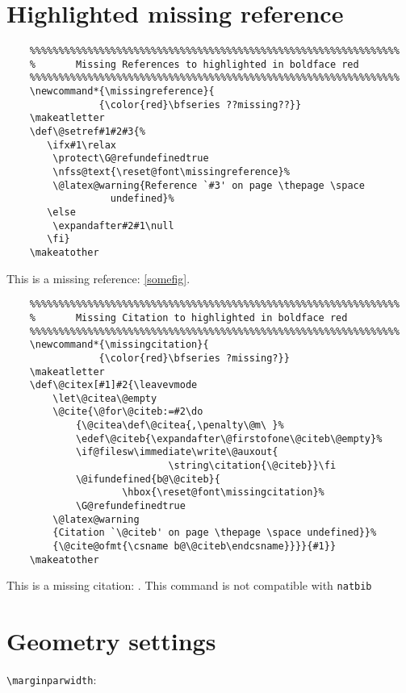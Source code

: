 \documentclass{article}
\begin{document}
\section{Highlighted missing reference}
\begin{minipage}[t]{0.78\textwidth}
    \begin{verbatim}
    %%%%%%%%%%%%%%%%%%%%%%%%%%%%%%%%%%%%%%%%%%%%%%%%%%%%%%%%%%%%%%%%
    %       Missing References to highlighted in boldface red
    %%%%%%%%%%%%%%%%%%%%%%%%%%%%%%%%%%%%%%%%%%%%%%%%%%%%%%%%%%%%%%%%
    \newcommand*{\missingreference}{
                {\color{red}\bfseries ??missing??}}
    \makeatletter
    \def\@setref#1#2#3{%
       \ifx#1\relax
        \protect\G@refundefinedtrue
        \nfss@text{\reset@font\missingreference}%
        \@latex@warning{Reference `#3' on page \thepage \space
                  undefined}%
       \else
        \expandafter#2#1\null
       \fi}
    \makeatother
    \end{verbatim}
\end{minipage}
\begin{minipage}[t]{0.18\textwidth}
    This is a missing reference: \ref{somefig}.
\end{minipage}
\newline
\begin{minipage}[t]{0.78\textwidth}
    \begin{verbatim}
    %%%%%%%%%%%%%%%%%%%%%%%%%%%%%%%%%%%%%%%%%%%%%%%%%%%%%%%%%%%%%%%%
    %       Missing Citation to highlighted in boldface red
    %%%%%%%%%%%%%%%%%%%%%%%%%%%%%%%%%%%%%%%%%%%%%%%%%%%%%%%%%%%%%%%%
    \newcommand*{\missingcitation}{
                {\color{red}\bfseries ?missing?}}
    \makeatletter
    \def\@citex[#1]#2{\leavevmode
        \let\@citea\@empty
        \@cite{\@for\@citeb:=#2\do
            {\@citea\def\@citea{,\penalty\@m\ }%
            \edef\@citeb{\expandafter\@firstofone\@citeb\@empty}%
            \if@filesw\immediate\write\@auxout{
                            \string\citation{\@citeb}}\fi
            \@ifundefined{b@\@citeb}{
                    \hbox{\reset@font\missingcitation}%
            \G@refundefinedtrue
        \@latex@warning
        {Citation `\@citeb' on page \thepage \space undefined}}%
        {\@cite@ofmt{\csname b@\@citeb\endcsname}}}}{#1}}
    \makeatother
    \end{verbatim}
\end{minipage}
\begin{minipage}[t]{0.18\textwidth}
    This is a missing citation: \cite{somebib}. This command is not compatible with \texttt{natbib}
\end{minipage}


\section{Geometry settings}
\pagediagram
{}

\verb|\marginparwidth|: \prntlen{\marginparwidth}


\end{document}
